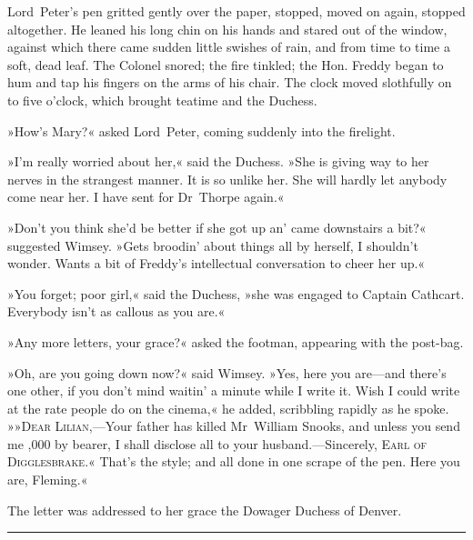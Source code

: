Lord~Peter's pen gritted gently over the paper, stopped, moved on again, stopped altogether. He leaned his long chin on his hands and stared out of the window, against which there came sudden little swishes of rain, and from time to time a soft, dead leaf. The Colonel snored; the fire tinkled; the Hon. Freddy began to hum and tap his fingers on the arms of his chair. The clock moved slothfully on to five o'clock, which brought teatime and the Duchess.

»How's Mary?« asked Lord~Peter, coming suddenly into the firelight.

»I'm really worried about her,« said the Duchess. »She is giving way to her nerves in the strangest manner. It is so unlike her. She will hardly let anybody come near her. I have sent for Dr~Thorpe again.«

»Don't you think she'd be better if she got up an' came downstairs a bit?« suggested Wimsey. »Gets broodin' about things all by herself, I shouldn't wonder. Wants a bit of Freddy's intellectual conversation to cheer her up.«

»You forget; poor girl,« said the Duchess, »she was engaged to Captain Cathcart. Everybody isn't as callous as you are.«

»Any more letters, your grace?« asked the footman, appearing with the post-bag.

»Oh, are you going down now?« said Wimsey. »Yes, here you are—and there's one other, if you don't mind waitin' a minute while I write it. Wish I could write at the rate people do on the cinema,« he added, scribbling rapidly as he spoke. »»\textsc{Dear Lilian},—Your father has killed Mr~William Snooks, and unless you send me ,000 by bearer, I shall disclose all to your husband.—Sincerely, \textsc{Earl of Digglesbrake}.« That's the style; and all done in one scrape of the pen. Here you are, Fleming.«

The letter was addressed to her grace the Dowager Duchess of Denver.

\noindent\hfil\rule{0.5\textwidth}{.4pt}\hfil

\makeatletter
{}
{%
\clearpage
}{%

}
\makeatother

